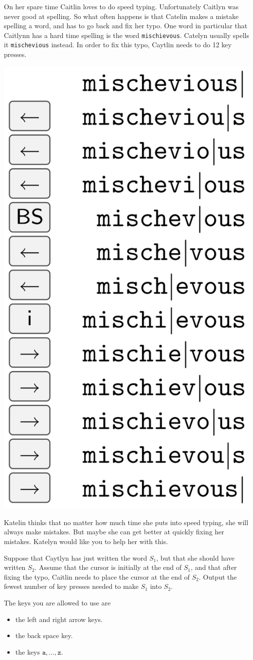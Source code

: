 

On her spare time Caitlin loves to do speed typing. 
Unfortunately Caitlyn was never good at spelling. 
So what often happens is that Catelin makes a mistake spelling a word, 
and has to go back and fix her typo.
One word in particular that Caitlynn has a hard time spelling is the word \texttt{mischievous}.
Catelyn usually spells it \texttt{mischevious} instead. 
In order to fix this typo, Caytlin needs to do 12 key presses.

\begin{center}

\includegraphics[width=.2\textwidth]{mischievous.png}

\end{center}


Katelin thinks that no matter how much time she puts into speed typing, she will always make mistakes. 
But maybe she can get better at quickly fixing her mistakes. Katelyn would like you to help her with this.

Suppose that Caytlyn has just written the word $S_1$, but that she should have written $S_2$. 
Assume that the cursor is initially at the end of $S_1$, 
and that after fixing the typo, Caitlin needs to place the cursor at the end of $S_2$.
Output the fewest number of key presses needed to make $S_1$ into $S_2$.

The keys you are allowed to use are

\begin{itemize}
	\item the left and right arrow keys.
	\item the back space key.
	\item the keys $\texttt{a}, \ldots, \texttt{z}$.
\end{itemize}

